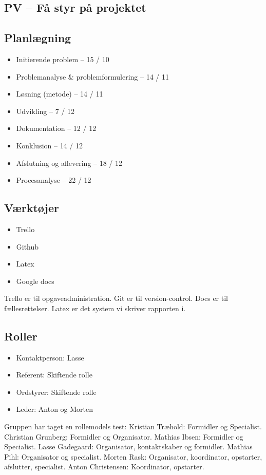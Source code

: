 \documentclass[oneside,a4paper,titlepage]{article}
\begin{document}
\begin{itemize}
\section*{PV – Få styr på projektet}
\subsection*{Planlægning}
\begin{itemize}
  \item Initierende problem – 15 / 10
  \item Problemanalyse \& problemformulering – 14 / 11
  \item Løsning (metode) – 14 / 11
  \item Udvikling – 7 / 12
  \item Dokumentation – 12 / 12
  \item Konklusion – 14 / 12
  \item Afslutning og aflevering – 18 / 12
  \item Procesanalyse – 22 / 12
\end{itemize}

\subsection*{Værktøjer}
\begin{itemize}
  \item Trello
  \item Github
  \item Latex
  \item Google docs
\end{itemize}
Trello er til opgaveadministration.
Git er til version-control.
Docs er til fællesrettelser.
Latex er det system vi skriver rapporten i.
\subsection*{Roller}
\begin{itemize}
  \item Kontaktperson: Lasse
  \item Referent: Skiftende rolle
  \item Ordstyrer: Skiftende rolle
  \item Leder: Anton og Morten
\end{itemize}
Gruppen har taget en rollemodels test: \newline
Kristian Træhold: Formidler og Specialist. \newline
Christian Grunberg: Formidler og Organisator.\newline
Mathias Ibsen: Formidler og Specialist.\newline
Lasse Gadegaard: Organisator, kontaktskaber og formidler.\newline
Mathias Pihl: Organisator og specialist.\newline
Morten Rask: Organisator, koordinator, opstarter, afslutter, specialist.\newline
Anton Christensen: Koordinator, opstarter.\newline


\end{itemize}
\end{document}
